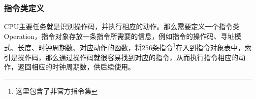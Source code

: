 \documentclass[a4paper]{ltxdoc}
\begin{document}
{	%






\subsubsection{指令类定义}
CPU主要任务就是识别操作码，并执行相应的动作。那么需要定义一个指令类Operation，指令对象存放一条指令所需要的信息，例如指令的操作码、寻址模式、长度、时钟周期数、对应动作的函数，将256条指令\footnote{这里包含了非官方指令集}存入到指令对象表中，索引是操作码，那么通过操作码就很容易找到对应的指令，从而执行指令相应的动作，返回相应的时钟周期数，供后续使用。


}
\end{document}
